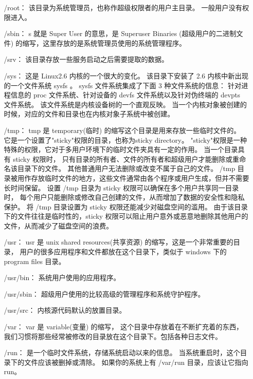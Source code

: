 \documentclass{ctexart}
\begin{document}
    /root：
    该目录为系统管理员，也称作超级权限者的用户主目录。
    一般用户没有权限进入。

    /sbin：
    s 就是 Super User 的意思，是 Superuser Binaries (超级用户的二进制文件) 的缩写，这里存放的是系统管理员使用的系统管理程序。


    /srv：
    该目录存放一些服务启动之后需要提取的数据。

    /sys：
    这是 Linux2.6 内核的一个很大的变化。
    该目录下安装了 2.6 内核中新出现的一个文件系统 sysfs 。
    sysfs 文件系统集成了下面 3 种文件系统的信息：
    针对进程信息的 proc 文件系统、针对设备的 devfs 文件系统以及针对伪终端的 devpts 文件系统。
    该文件系统是内核设备树的一个直观反映。
    当一个内核对象被创建的时候，对应的文件和目录也在内核对象子系统中被创建。

    /tmp：
    tmp 是 temporary(临时) 的缩写这个目录是用来存放一些临时文件的。
    它是一个设置了"sticky"权限的目录，也称为sticky directory。
    "sticky"权限是一种特殊的权限，它对于多用户环境下的临时文件夹具有一定的作用。
    当一个目录具有 sticky 权限时，
    只有目录的所有者、文件的所有者和超级用户才能删除或重命名该目录下的文件。
    其他普通用户无法删除或改变不属于自己的文件。
    /tmp 目录被用作存放临时文件的地方，这些文件通常由各个程序或用户生成，但并不需要长时间保留。
    设置 /tmp 目录为 sticky 权限可以确保在多个用户共享同一目录时，
    每个用户只能删除或修改自己创建的文件，从而增加了数据的安全性和隐私保护。
    将 /tmp 目录设置为 sticky 权限还能减少对磁盘空间的滥用。
    由于该目录下的文件往往是临时性的，sticky 权限可以阻止用户意外或恶意地删除其他用户的文件，从而减少了磁盘空间的浪费。

    /usr：
    usr 是 unix shared resources(共享资源) 的缩写，这是一个非常重要的目录，
    用户的很多应用程序和文件都放在这个目录下，类似于 windows 下的 program files 目录。

    /usr/bin：
    系统用户使用的应用程序。

    /usr/sbin：
    超级用户使用的比较高级的管理程序和系统守护程序。

    /usr/src：
    内核源代码默认的放置目录。

    /var：
    var 是 variable(变量) 的缩写，
    这个目录中存放着在不断扩充着的东西，我们习惯将那些经常被修改的目录放在这个目录下。包括各种日志文件。

    /run：
    是一个临时文件系统，存储系统启动以来的信息。
    当系统重启时，这个目录下的文件应该被删掉或清除。
    如果你的系统上有 /var/run 目录，应该让它指向 run。
\end{document}
